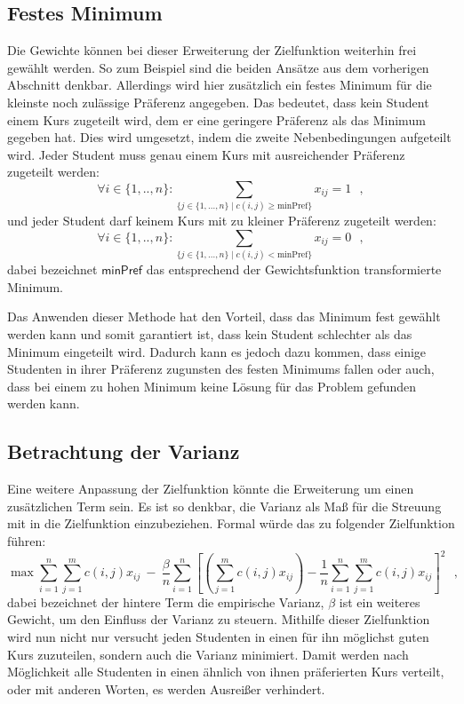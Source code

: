        \subsection{Festes Minimum}
            Die Gewichte können bei dieser Erweiterung der Zielfunktion weiterhin frei gewählt werden. 
            So zum Beispiel sind die beiden Ansätze aus dem vorherigen Abschnitt denkbar.
            Allerdings wird hier zusätzlich ein festes Minimum für die kleinste noch zulässige Präferenz angegeben.
            Das bedeutet, dass kein Student einem Kurs zugeteilt wird, dem er eine geringere Präferenz als das Minimum gegeben hat.
            Dies wird umgesetzt, indem die zweite Nebenbedingungen aufgeteilt wird.
            Jeder Student muss genau einem Kurs mit ausreichender Präferenz zugeteilt werden:
            $$ \forall {i \in \{1,..,n\}}: \sum_{\{j \in \{1, \dots, n\} \mid c(i,j) \geq \text{minPref}\}} x_{ij} = 1 ~~~,$$
            und jeder Student darf keinem Kurs mit zu kleiner Präferenz zugeteilt werden:
            $$ \forall {i \in \{1,..,n\}}: \sum_{\{j \in \{1, \dots, n\} \mid c(i,j) < \text{minPref}\}} x_{ij} = 0 ~~~,$$
            dabei bezeichnet $ \textsf{minPref} $ das entsprechend der Gewichtsfunktion transformierte Minimum.
            
            Das Anwenden dieser Methode hat den Vorteil, dass das Minimum fest gewählt werden kann und somit garantiert ist, dass kein Student schlechter als das Minimum eingeteilt wird.
            Dadurch kann es jedoch dazu kommen, dass einige Studenten in ihrer Präferenz zugunsten des festen Minimums fallen oder auch, dass bei einem zu hohen Minimum keine Lösung für das Problem gefunden werden kann.
            
        
        \subsection{Betrachtung der Varianz}
            Eine weitere Anpassung der Zielfunktion könnte die Erweiterung um einen zusätzlichen Term sein.
            Es ist so denkbar, die Varianz als Maß für die Streuung mit in die Zielfunktion einzubeziehen.
            Formal würde das zu folgender Zielfunktion führen:
                $$ \max \sum_{i=1}^{n} \sum_{j=1}^{m} c(i,j)x_{ij} 
                                ~-~ \frac{\beta}{n} \sum_{i=1}^{n}
                                    \left[\left(\sum_{j=1}^{m} c(i,j)x_{ij}\right) - \frac{1}{n} \sum_{i=1}^{n} \sum_{j=1}^{m} c(i,j)x_{ij}\right]^2 ~~~,$$
            dabei bezeichnet der hintere Term die empirische Varianz, $ \beta $ ist ein weiteres Gewicht, um den Einfluss der Varianz zu steuern.
            Mithilfe dieser Zielfunktion wird nun nicht nur versucht jeden Studenten in einen für ihn möglichst guten Kurs zuzuteilen, sondern auch die Varianz minimiert.
            Damit werden nach Möglichkeit alle Studenten in einen ähnlich von ihnen präferierten Kurs verteilt, oder mit anderen Worten, es werden Ausreißer verhindert.\\
            
